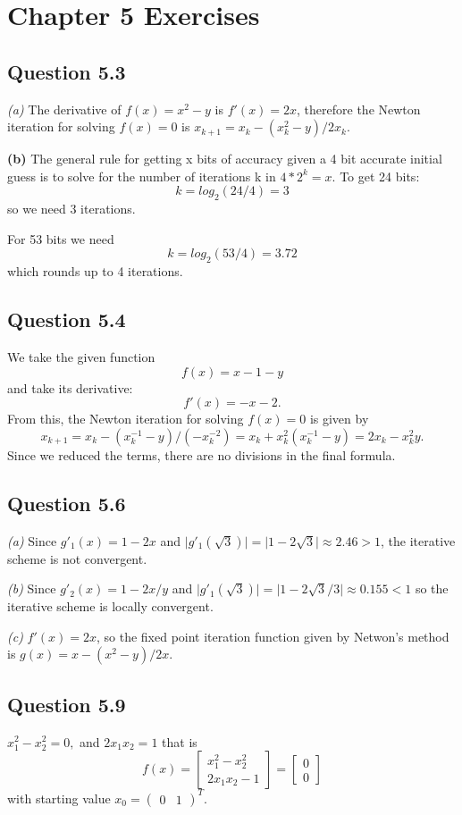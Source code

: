 \documentclass[12pt,a4paper]{report}
\author{Malcolm Watt}
\begin{document}
\section*{Chapter 5 Exercises}
\subsection*{Question 5.3}
\textit{(a)} The derivative of $f(x) = x^2 -y$ is $f'(x)=2x$, therefore
the Newton iteration for solving $f(x) = 0$ is $x_{k+1}=x_k - (x_{k}^{2} - y) / 2 x_k$.

\textbf{(b)} The general rule for getting x bits of accuracy given a 4 bit accurate initial guess
is to solve for the number of iterations k in $4 * 2^k = x$. To get 24 bits: $$k = log_2(24 / 4) = 3$$
so we need 3 iterations.

For 53 bits we need $$k = log_2(53/4) = 3.72$$ which rounds up to 4 iterations.

\subsection*{Question 5.4}
We take the given function $$f(x) = x-1-y$$ and take its derivative: $$f'(x) = -x-2.$$
From this, the Newton iteration for solving $f(x) = 0$ is given by
$$x_{k+1} = x_k - (x_k^{-1} - y) / (-x_k^{-2})=x_k + x_k^{2}(x_k^{-1}-y)=2x_k - x_k^{2}y.$$
Since we reduced the terms, there are no divisions in the final formula.

\subsection*{Question 5.6}
\textit{(a)} Since $g'_1(x) = 1- 2x$ and $\vert g'_1(\sqrt{3})\vert = \vert 1 - 2 \sqrt{3} \vert \approx 2.46 > 1$,
the iterative scheme is not convergent.

\textit{(b)} Since $g'_2(x)=1 - 2x / y$ and $ \vert g'_1(\sqrt{3})\vert = \vert 1 - 2\sqrt{3}/3 \vert \approx 0.155 < 1$ so the iterative scheme is locally convergent.

\textit{(c)} $f'(x) = 2x$, so the fixed point iteration function given by Netwon's method is $g(x) = x- (x^2 -y) / 2x$.

\subsection*{Question 5.9}
$x^2_1 - x^2_2 = 0,$ and $2x_1 x_2 = 1$
that is $$f(x) = \left[\begin{smallmatrix}x^2_1 - x^2_2 \\ 2x_1 x_2 - 1 \end{smallmatrix} \right] =
\left[\begin{smallmatrix}0 \\ 0\end{smallmatrix} \right]$$
with starting value $x_0 = \left(\begin{smallmatrix} 0 & 1\end{smallmatrix} \right)^T$.
\end{document}

